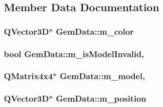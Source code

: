 \subsection{Member Data Documentation}
\hypertarget{class_gem_data_aa5888d4d3212ba621643a0f1c1efca76}{
\subsubsection[{m\+\_\+color}]{\setlength{\rightskip}{0pt plus 5cm}Q\+Vector3\+D$\ast$ Gem\+Data\+::m\+\_\+color\hspace{0.3cm}{\ttfamily [protected]}}}\label{class_gem_data_aa5888d4d3212ba621643a0f1c1efca76}
\hypertarget{class_gem_data_a82ba26b9a691149c8525244969cceaef}{
\subsubsection[{m\+\_\+is\+Model\+Invalid}]{\setlength{\rightskip}{0pt plus 5cm}bool Gem\+Data\+::m\+\_\+is\+Model\+Invalid\hspace{0.3cm}{\ttfamily [mutable]}, {\ttfamily [protected]}}}\label{class_gem_data_a82ba26b9a691149c8525244969cceaef}
\hypertarget{class_gem_data_a3a7eec529b0228a410ea608401cf2f1a}{
\subsubsection[{m\+\_\+model}]{\setlength{\rightskip}{0pt plus 5cm}Q\+Matrix4x4$\ast$ Gem\+Data\+::m\+\_\+model\hspace{0.3cm}{\ttfamily [mutable]}, {\ttfamily [protected]}}}\label{class_gem_data_a3a7eec529b0228a410ea608401cf2f1a}
\hypertarget{class_gem_data_ad5c2bc9fc38c168fbbf143e0092c8cdb}{
\subsubsection[{m\+\_\+position}]{\setlength{\rightskip}{0pt plus 5cm}Q\+Vector3\+D$\ast$ Gem\+Data\+::m\+\_\+position\hspace{0.3cm}{\ttfamily [protected]}}}\label{class_gem_data_ad5c2bc9fc38c168fbbf143e0092c8cdb}
